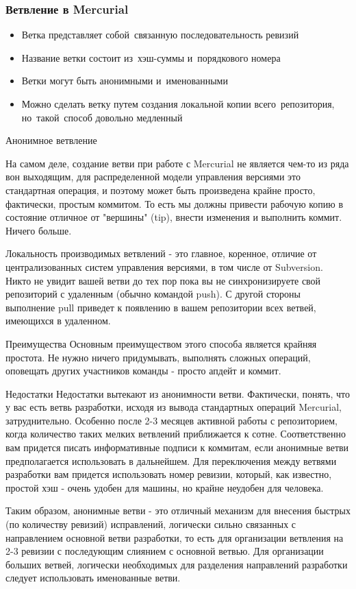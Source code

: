 \documentclass{../industrial-development}
\begin{document}
\begin{frame} \frametitle{Ветвление в Mercurial}
  \begin{itemize}
  \item Ветка представляет собой~связанную последовательность ревизий
  \item Название ветки состоит из~хэш-суммы и~порядкового номера
  \item Ветки могут быть анонимными и~именованными
  \item Можно сделать ветку путем создания локальной копии всего~репозитория, но~такой~способ довольно медленный
  \end{itemize}
\end{frame}

\lecturenotes

Анонимное ветвление

На самом деле, создание ветви при работе с Mercurial не является чем-то из ряда вон выходящим, для распределенной модели управления версиями это стандартная операция, и поэтому может быть произведена крайне просто, фактически, простым коммитом. То есть мы должны привести рабочую копию в состояние отличное от "вершины" (tip), внести изменения и выполнить коммит. Ничего больше. 

 Локальность производимых ветвлений - это главное, коренное, отличие от централизованных систем управления версиями, в том числе от Subversion. Никто не увидит вашей ветви до тех пор пока вы не синхронизируете свой репозиторий с удаленным (обычно командой push). С другой стороны выполнение pull приведет к появлению в вашем репозитории всех ветвей, имеющихся в удаленном.

Преимущества
Основным преимуществом этого способа является крайняя простота. Не нужно ничего придумывать, выполнять сложных операций, оповещать других участников команды - просто апдейт и коммит.

Недостатки
Недостатки вытекают из анонимности ветви. Фактически, понять, что у вас есть ветвь разработки, исходя из вывода стандартных операций Mercurial, затруднительно. Особенно после 2-3 месяцев активной работы с репозиторием, когда количество таких мелких ветвлений приближается к сотне. Соответственно вам придется писать информативные подписи к коммитам, если анонимные ветви предполагается использовать в дальнейшем. Для переключения между ветвями разработки вам придется использовать номер ревизии, который, как известно, простой хэш - очень удобен для машины, но крайне неудобен для человека.

Таким образом, анонимные ветви - это отличный механизм для внесения быстрых (по количеству ревизий) исправлений, логически сильно связанных с направлением основной ветви разработки, то есть для организации ветвления на 2-3 ревизии с последующим слиянием с основной ветвью. Для организации больших ветвей, логически необходимых для разделения направлений разработки следует использовать именованные ветви.
\end{document}
